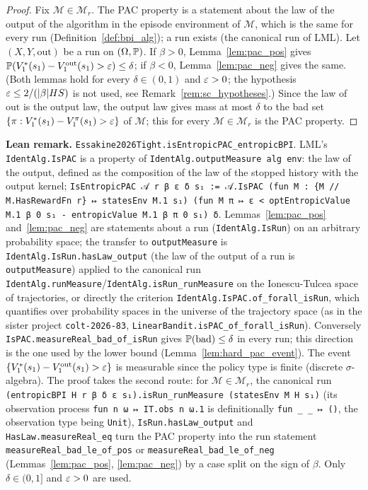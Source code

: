 \begin{proof}
\leanok
Fix $\mathcal M \in \mathcal M_r$. The PAC property is a statement about the law of the output
of the algorithm in the episode environment of $\mathcal M$, which is the same for every run
(Definition~\ref{def:bpi_alg}); a run exists (the canonical run of LML). Let
$(X, Y, \mathrm{out})$ be a run on $(\Omega, \mathbb{P})$. If $\beta > 0$, Lemma~\ref{lem:pac_pos}
gives $\mathbb{P}(V^*_1(s_1) - V^{\mathrm{out}}_1(s_1) > \varepsilon) \le \delta$; if $\beta < 0$,
Lemma~\ref{lem:pac_neg} gives the same. (Both lemmas hold for every $\delta \in (0,1)$ and
$\varepsilon > 0$; the hypothesis $\varepsilon \le 2/(|\beta|HS)$ is not used, see
Remark~\ref{rem:sc_hypotheses}.) Since the law of $\mathrm{out}$ is the output law, the
output law gives mass at most $\delta$ to the bad set $\{\pi : V^*_1(s_1) - V^\pi_1(s_1) > \varepsilon\}$
of $\mathcal M$; this for every $\mathcal M \in \mathcal M_r$ is the PAC property.
\end{proof}

\textbf{Lean remark.} \texttt{Essakine2026Tight.isEntropicPAC\_entropicBPI}. LML's
\texttt{IdentAlg.IsPAC} is a property of \texttt{IdentAlg.outputMeasure alg env}: the law of the
output, defined as the composition of the law of the stopped history with the output kernel;
\texttt{IsEntropicPAC 𝒜 r β ε δ s₁ := 𝒜.IsPAC (fun M : \{M // M.HasRewardFn r\} ↦ statesEnv M.1 s₁) (fun M π ↦ ε < optEntropicValue M.1 β 0 s₁ - entropicValue M.1 β π 0 s₁) δ}.
Lemmas~\ref{lem:pac_pos} and~\ref{lem:pac_neg} are statements about a run
(\texttt{IdentAlg.IsRun}) on an arbitrary probability space; the transfer to
\texttt{outputMeasure} is \texttt{IdentAlg.IsRun.hasLaw\_output} (the law of the output of a
run is \texttt{outputMeasure}) applied to the canonical run
\texttt{IdentAlg.runMeasure}/\texttt{IdentAlg.isRun\_runMeasure} on the Ionescu-Tulcea space of
trajectories, or directly the criterion \texttt{IdentAlg.IsPAC.of\_forall\_isRun}, which
quantifies over probability spaces in the universe of the trajectory space (as in the sister
project \texttt{colt-2026-83}, \texttt{LinearBandit.isPAC\_of\_forall\_isRun}). Conversely
\texttt{IsPAC.measureReal\_bad\_of\_isRun} gives $\mathbb{P}(\mathrm{bad}) \le \delta$ in every run; this
direction is the one used by the lower bound (Lemma~\ref{lem:hard_pac_event}). The event
$\{V^*_1(s_1) - V^{\mathrm{out}}_1(s_1) > \varepsilon\}$ is measurable since the policy type is finite
(discrete $\sigma$-algebra). The proof takes the second route: for $\mathcal M \in \mathcal M_r$, the canonical run
\texttt{(entropicBPI H r β δ ε s₁).isRun\_runMeasure (statesEnv M H s₁)} (its observation process
\texttt{fun n ω ↦ IT.obs n ω.1} is definitionally \texttt{fun \_ \_ ↦ ()}, the observation type being
\texttt{Unit}), \texttt{IsRun.hasLaw\_output} and \texttt{HasLaw.measureReal\_eq} turn the PAC property into
the run statement \texttt{measureReal\_bad\_le\_of\_pos} or \texttt{measureReal\_bad\_le\_of\_neg}
(Lemmas~\ref{lem:pac_pos}, \ref{lem:pac_neg}) by a case split on the sign of $\beta$. Only $\delta \in (0, 1]$ and
$\varepsilon > 0$ are used.

